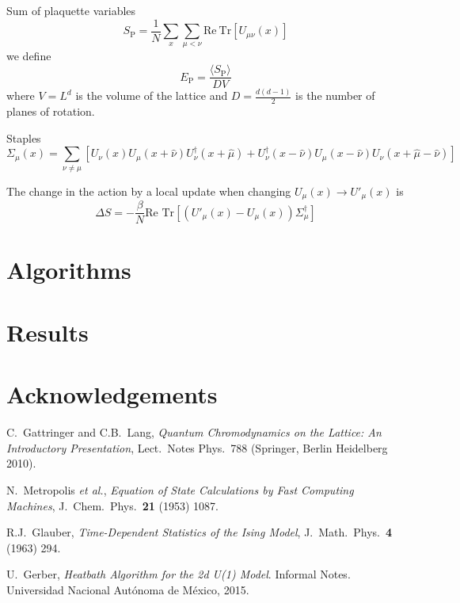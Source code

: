 \documentclass[12pt,a4paper]{article}
\begin{document}
Sum of plaquette variables
\begin{equation}
	\label{eq:Sp}
	S_{\text{P}} = \frac{1}{N} \sum_x\sum_{\mu < \nu} \text{Re}\ \text{Tr} [U_{\mu\nu}(x)]
\end{equation}
we define
\begin{equation}
	\label{eq:Ep}
	E_{\text{P}} =\frac{ \langle S_{\text{P}} \rangle}{D V}
\end{equation}
where $V=L^d$ is the volume of the lattice and $D = \frac{d(d-1)}{2}$ is the number of planes of rotation.

Staples
\begin{equation}
	\label{eq:staples}
	\Sigma_{\mu}(x) = \sum_{\nu \neq \mu} \left[ U_{\nu}(x)U_{\mu}(x+\hat{\nu})U_{\nu}^{\dagger}(x+\hat{\mu}) + U_{\nu}^{\dagger}(x-\hat{\nu})U_{\mu}(x-\hat{\nu})U_{\nu}(x+\hat{\mu}-\hat{\nu})\right]
\end{equation}


The change in the action  by a local update when changing $U_{\mu}(x) \to U'_{\mu}(x)$ is
\begin{equation}
	\label{eq:DS}
	\Delta S = -\frac{\beta}{N} \text{Re } \text{Tr} \left[ \left( U'_{\mu}(x) - U_{\mu}(x) \right)\Sigma_{\mu}^{\dagger}\right]
\end{equation}


\section{Algorithms}


\section{Results}

\section{Acknowledgements}



\begin{thebibliography}{99}

 C.\ Gattringer and C.B.\ Lang, \emph{Quantum Chromodynamics on the Lattice: An Introductory Presentation},  Lect.\ Notes Phys.\ 788 (Springer, Berlin Heidelberg 2010).

 N.\ Metropolis {\it et al.},
\emph{Equation of State Calculations by Fast Computing Machines},
J.\ Chem.\ Phys.\ {\bf 21} (1953) 1087.

 R.J.\ Glauber,
  \emph{Time-Dependent Statistics of the Ising Model},
  J.\ Math.\ Phys.\ {\bf 4} (1963) 294.
  
 U.\ Gerber,
  \emph{Heatbath Algorithm for the 2d U(1) Model}.
  Informal Notes. Universidad Nacional Autónoma de México, 2015.  

\end{thebibliography}
\end{document}
